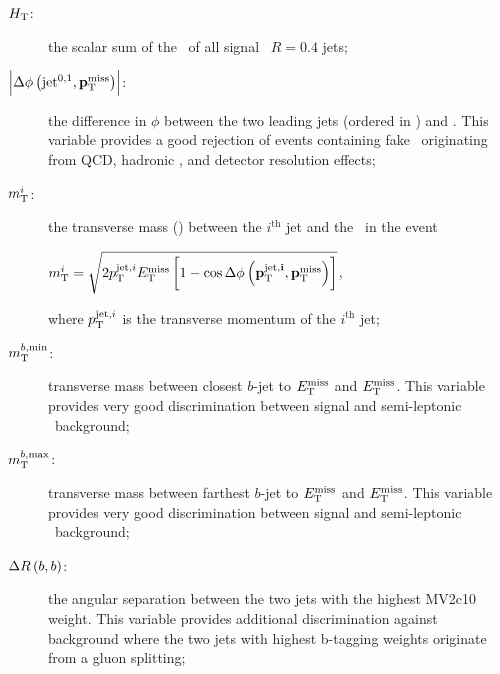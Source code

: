 			\begin{description}
				\item[\boldmath $H_{\mathrm{T}}$:] the scalar sum of the \pt\ of all signal \antikt\ $R=0.4$ jets;

				\item[$\left|\Delta\phi\left(\mathrm{jet}^{0,1},\mathbf{p}_\mathrm{T}^\mathrm{miss}\right)\right|$:] the difference in $\phi$ between the two leading jets (ordered in \pt) and \ptmiss. This variable provides a good rejection of events containing fake \met\ originating from \ac{QCD}, hadronic \ttbar, and detector resolution effects;

				\item[\boldmath $m_{\mathrm{T}}^{i}$:] the transverse mass (\mt) between the $i^{\mathrm{th}}$ jet and the \met\ in the event\\
				\begin{center}
					$\mtjetimet = \sqrt{2\ptjeti\met\left[1-\cos{\Delta\phi\left(\mathrm{\mathbf{\ptjeti}},\ptmiss\right)}\right]}$,
				\end{center}
				where $p_{\mathrm{T}}^{\mathrm{jet},i}$ is the transverse momentum of the $i^{\mathrm{th}}$ jet;

				\item[\boldmath $m_{\mathrm{T}}^{b,\mathrm{min}}$:] transverse mass between closest $b$-jet to $E_{\mathrm{T}}^{\mathrm{miss}}$ and $E_{\mathrm{T}}^{\mathrm{miss}}$. This variable provides very good discrimination between signal and semi-leptonic \ttbar\ background;

				\item[\boldmath $m_{\mathrm{T}}^{b,\mathrm{max}}$:] transverse mass between farthest $b$-jet to $E_{\mathrm{T}}^{\mathrm{miss}}$ and $E_{\mathrm{T}}^{\mathrm{miss}}$. This variable provides very good discrimination between signal and semi-leptonic \ttbar\ background;
												
				\item[\boldmath $\Delta R\left(b,b\right)$:] the angular separation between the two jets with the highest MV2c10 weight. This variable provides additional discrimination against background where the two jets with highest b-tagging weights originate from a gluon splitting;


\end{description}
